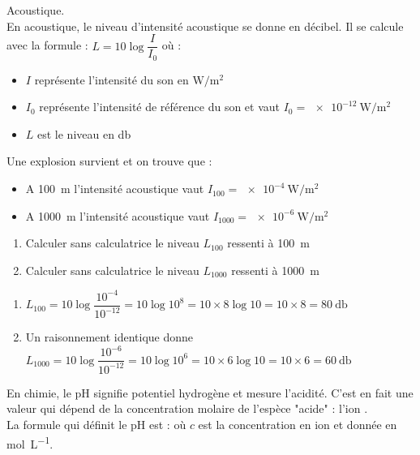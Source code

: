 \documentclass[12pt,a4paper,oneside,dvipsnames,table,svgnames,skins,theorems]{report}
\begin{document}
\finexo

\vspace{0.5cm}

\exo{} Acoustique.\\
En acoustique, le niveau d'intensité acoustique se donne en décibel. Il se calcule avec la formule : $L=10\log\dfrac{I}{I_0}$ où : 
\begin{itemize}
\item $I$ représente l'intensité du son en $\si{\watt\per\meter\squared}$
\item $I_0$ représente l'intensité de référence du son et vaut $I_0 = \SI{e-12}{\watt\per\meter\squared}$
\item $L$ est le niveau en \si{\decibel}
\end{itemize}

Une explosion survient et on trouve que :
\begin{itemize}
\item A \SI{100}{\meter} l'intensité acoustique vaut $I_{100} = \SI{e-4}{\watt\per\meter\squared}$
\item A \SI{1000}{\meter} l'intensité acoustique vaut $I_{1000} = \SI{e-6}{\watt\per\meter\squared}$
\end{itemize}

\begin{enumerate}
\item Calculer sans calculatrice le niveau $L_{100}$ ressenti à \SI{100}{\meter}
\item Calculer sans calculatrice le niveau $L_{1000}$ ressenti à \SI{1000}{\meter}
\end{enumerate}

\begin{correction}
\begin{enumerate}
\item $L_{100} = 10 \log \dfrac{10^{-4}}{10^{-12}} = 10 \log 10^{8} = 10 \times 8 \log 10 = 10 \times 8 = \SI{80}{\decibel}$
\item Un raisonnement identique donne $L_{1000} = 10 \log \dfrac{10^{-6}}{10^{-12}} = 10 \log 10^{6} = 10 \times 6 \log 10 = 10 \times 6 = \SI{60}{\decibel}$
\end{enumerate}
\end{correction}
\finexo

\vspace{0.5cm}

\exo{} En chimie, le pH signifie potentiel hydrogène et mesure l'acidité. C'est en fait une valeur qui dépend de la concentration molaire de l'espèce "acide" : l'ion .\\
La formule qui définit le pH est :  où $c$ est la concentration en ion  et donnée en \si{\mol\per\liter}.
\end{document}
